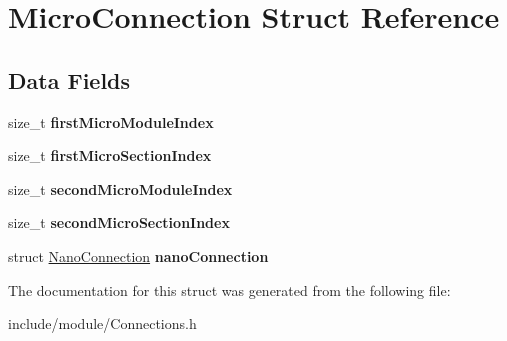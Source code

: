 \hypertarget{struct_micro_connection}{}\section{Micro\+Connection Struct Reference}
\label{struct_micro_connection}
\subsection*{Data Fields}
\begin{DoxyCompactItemize}
\item 
\hypertarget{struct_micro_connection_abefb60f42261bfee9475d09ce4a1c1ae}{}\label{struct_micro_connection_abefb60f42261bfee9475d09ce4a1c1ae} 
size\+\_\+t {\bfseries first\+Micro\+Module\+Index}
\item 
\hypertarget{struct_micro_connection_a90529e4335360f228c110ad6aca89708}{}\label{struct_micro_connection_a90529e4335360f228c110ad6aca89708} 
size\+\_\+t {\bfseries first\+Micro\+Section\+Index}
\item 
\hypertarget{struct_micro_connection_ab641c9bc0121061efc97aec4093f364c}{}\label{struct_micro_connection_ab641c9bc0121061efc97aec4093f364c} 
size\+\_\+t {\bfseries second\+Micro\+Module\+Index}
\item 
\hypertarget{struct_micro_connection_add9abee9bec1f3995e99259987fe25d7}{}\label{struct_micro_connection_add9abee9bec1f3995e99259987fe25d7} 
size\+\_\+t {\bfseries second\+Micro\+Section\+Index}
\item 
\hypertarget{struct_micro_connection_a5a4f92d0a490a4299ca674ca0527836b}{}\label{struct_micro_connection_a5a4f92d0a490a4299ca674ca0527836b} 
struct \hyperlink{struct_nano_connection}{Nano\+Connection} {\bfseries nano\+Connection}
\end{DoxyCompactItemize}


The documentation for this struct was generated from the following file\+:\begin{DoxyCompactItemize}
\item 
include/module/Connections.\+h\end{DoxyCompactItemize}
